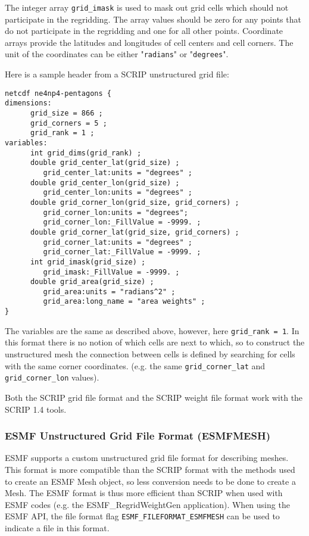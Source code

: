 The integer array {\tt grid\_imask} is used to mask out grid cells which should
not participate in the regridding. The array values should be zero for any points
that do not participate in the regridding and one for all other points.
Coordinate arrays provide the latitudes and longitudes of cell centers
and cell corners. The unit of the coordinates can be either "{\tt radians}" or "{\tt degrees}".

Here is a sample header from a SCRIP unstructured grid file:

\begin{verbatim}
netcdf ne4np4-pentagons {
dimensions:
      grid_size = 866 ;
      grid_corners = 5 ;
      grid_rank = 1 ;
variables:
      int grid_dims(grid_rank) ;
      double grid_center_lat(grid_size) ;
         grid_center_lat:units = "degrees" ;
      double grid_center_lon(grid_size) ;
         grid_center_lon:units = "degrees" ;
      double grid_corner_lon(grid_size, grid_corners) ;
         grid_corner_lon:units = "degrees";
         grid_corner_lon:_FillValue = -9999. ;
      double grid_corner_lat(grid_size, grid_corners) ;
         grid_corner_lat:units = "degrees" ;
         grid_corner_lat:_FillValue = -9999. ;
      int grid_imask(grid_size) ;
         grid_imask:_FillValue = -9999. ;
      double grid_area(grid_size) ;
         grid_area:units = "radians^2" ;
         grid_area:long_name = "area weights" ;
}
\end{verbatim}

The variables are the same as described above, however, here {\tt grid\_rank = 1}. In this format there
is no notion of which cells are next to which, so to construct the unstructured mesh the connection between
cells is defined by searching for cells with the same corner coordinates. (e.g. the same {\tt grid\_corner\_lat}
and {\tt grid\_corner\_lon} values).

Both the SCRIP grid file format and the SCRIP weight file format work with the SCRIP 1.4 tools.

\subsubsection{ESMF Unstructured Grid File Format (ESMFMESH)}\label{sec:fileformat:esmf}

ESMF supports a custom unstructured grid file format for describing meshes. This format is more compatible than the SCRIP format with the methods used to create an ESMF Mesh object, so less conversion needs to be done to create a Mesh. The ESMF format is thus more efficient than SCRIP when used with ESMF codes (e.g. the ESMF\_RegridWeightGen application). When using the ESMF API, the file format flag {\tt ESMF\_FILEFORMAT\_ESMFMESH} can be used to indicate a file in this format.

